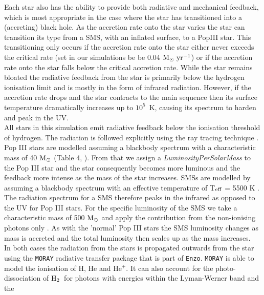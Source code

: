 \documentclass[twocolumn,iop,revtex4]{openjournal}
\newcommand{\enzoc}{\texttt{Enzo}}
\newcommand{\msolar} {$\rm{M_{\odot}}~$}
\newcommand{\msolarc} {$\rm{M_{\odot}}$}
\newcommand{\msolaryrc} {$\rm{M_{\odot}~yr^{-1}}$}
\newcommand{\molH} {$\rm{H_2}$~}
\begin{document}
\begin{figure}
\end{figure}
\indent Each star also has the ability to provide both radiative and mechanical feedback, which is
most appropriate in the case where the star has transitioned into a (accreting) black hole. As the
accretion rate onto the star varies the star can transition its type from a SMS, with an inflated
surface, to a PopIII star.  This transitioning only occurs if the accretion rate onto the star either
never exceeds the critical rate (set in our simulations be be 0.04 \msolaryrc) or if the accretion
rate onto the star falls below the critical accretion rate. While the star remains bloated the
radiative
feedback from the star is primarily below the hydrogen ionisation limit and is mostly in the
form of infrared radiation. However, if the accretion rate drops and the star contracts to the
main sequence then its surface temperature dramatically increases up to $10^5$~K,
causing its spectrum to harden and peak in the UV. \\
\indent All stars in this simulation emit radiative feedback below the ionisation threshold of
hydrogen. The radiation is followed explicitly using the ray tracing technique \citep{WiseAbel_2011}.
Pop III stars are modelled assuming a blackbody spectrum with a characteristic mass of 40 \msolarc
 (Table 4, \cite{Schaerer_2002}). From that we assign a \textit{LuminosityPerSolarMass} to the
Pop III star and the star consequently becomes more luminous and the feedback more intense as the mass
of the star increases.  SMSs are modelled by assuming
a blackbody spectrum with an effective temperature of T$_{\rm eff}$ = 5500 K \citep{Hosokawa_2013}.
The radiation spectrum for a SMS therefore peaks in the infrared as opposed to the UV for Pop
III stars. For the specific luminosity of the SMS we take a characteristic mass of 500 \msolar and
apply the contribution from the non-ionising photons only \citep{Schaerer_2002}. As with the 'normal'
Pop III stars the SMS luminosity changes as mass is accreted and the total luminosity then
scales up as the mass increases. \\
\indent In both cases the radiation from the stars is propagated outwards from the star using the
\texttt{MORAY} radiative transfer package \citep{WiseAbel_2011} that is part of \enzoc.
\texttt{MORAY} is able to model the ionisation of H, He and He$^{+}$. It can also account for the
photo-dissociation of \molH for photons with energies within the Lyman-Werner band and the
\end{document}
